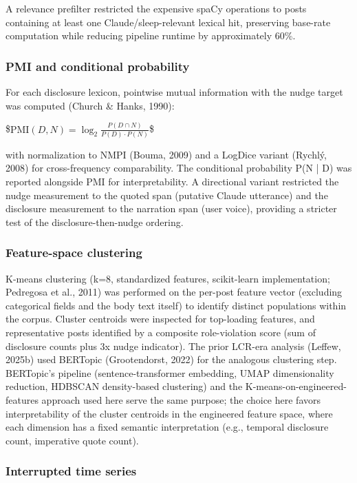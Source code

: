 \documentclass[11pt]{article}
\begin{document}
A relevance prefilter restricted the expensive spaCy operations to posts containing at least one Claude/sleep-relevant lexical hit, preserving base-rate computation while reducing pipeline runtime by approximately 60\%.

\subsubsection{PMI and conditional probability}

For each disclosure lexicon, pointwise mutual information with the nudge target was computed (Church \& Hanks, 1990):

\$$\text{PMI}(D, N) = \log_2 \frac{P(D \cap N)}{P(D) \cdot P(N)}$\$

with normalization to NMPI (Bouma, 2009) and a LogDice variant (Rychlý, 2008) for cross-frequency comparability. The conditional probability P(N | D) was reported alongside PMI for interpretability. A directional variant restricted the nudge measurement to the quoted span (putative Claude utterance) and the disclosure measurement to the narration span (user voice), providing a stricter test of the disclosure-then-nudge ordering.

\subsubsection{Feature-space clustering}

K-means clustering (k=8, standardized features, scikit-learn implementation; Pedregosa et al., 2011) was performed on the per-post feature vector (excluding categorical fields and the body text itself) to identify distinct populations within the corpus. Cluster centroids were inspected for top-loading features, and representative posts identified by a composite role-violation score (sum of disclosure counts plus 3x nudge indicator). The prior LCR-era analysis (Leffew, 2025b) used BERTopic (Grootendorst, 2022) for the analogous clustering step. BERTopic's pipeline (sentence-transformer embedding, UMAP dimensionality reduction, HDBSCAN density-based clustering) and the K-means-on-engineered-features approach used here serve the same purpose; the choice here favors interpretability of the cluster centroids in the engineered feature space, where each dimension has a fixed semantic interpretation (e.g., temporal disclosure count, imperative quote count).

\subsubsection{Interrupted time series}
\end{document}
